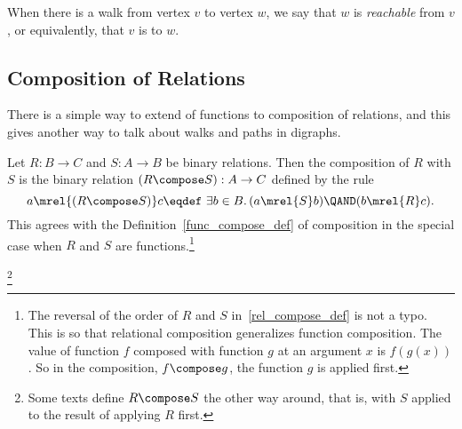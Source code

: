 \begin{definition}
When there is a walk from vertex $v$ to vertex $w$, we say that $w$ is
\emph{reachable} from $v$, or equivalently, that $v$ is
 to $w$.
\end{definition}

\subsection{Composition of Relations}\label{relation_compose_subsec}
There is a simple way to extend  
of functions to composition of relations, and this gives another way to talk about
walks and paths in digraphs.

\begin{definition}
Let $R: B\to C$ and $S: A \to B$ be binary relations.  Then the
composition of $R$ with $S$ is the binary relation $(R \compose
S): A\to C$ defined by the rule
\begin{equation}\label{rel_compose_def}
a \mrel{(R \compose S)} c \eqdef\ \exists b \in B.\, (a \mrel{S} b)
\QAND (b \mrel{R} c).
\end{equation}
This agrees with the Definition~\ref{func_compose_def} of composition
in the special case when $R$ and $S$ are functions.\footnote{The
  reversal of the order of $R$ and $S$ in~\eqref{rel_compose_def} is
  not a typo.  This is so that relational composition generalizes
  function composition.  The value of function $f$ composed with
  function $g$ at an argument $x$ is $f(g(x))$.  So in the
  composition, $f \compose g$, the function $g$ is applied first.}
\end{definition}

\begin{editingnotes}

\footnote{Some texts define $R \compose S$ the other way around, that
  is, with $S$ applied to the result of applying $R$ first.}

\end{editingnotes}

